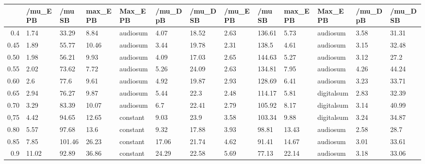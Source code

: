 \begin{table}[ht]
\centering
\begin{tabular}{rllllllllllll}
  \hline
 & /mu\_E PB & /mu SB & max\_E PB & Max\_E PB & /mu\_D pB & /mu\_D SB & /mu\_E PB & /mu SB & max\_E PB & Max\_E PB & /mu\_D pB & /mu\_D SB \\ 
  \hline
0.4 & 1.74 & 33.29 & 8.84 & audiosum & 4.07 & 18.52 & 2.63 & 136.61 & 5.73 & audiosum & 3.58 & 31.31 \\ 
  0.45 & 1.89 & 55.77 & 10.46 & audiosum & 3.44 & 19.78 & 2.31 & 138.5 & 4.61 & audiosum & 3.15 & 32.48 \\ 
  0.50 & 1.98 & 56.21 & 9.93 & audiosum & 4.09 & 17.03 & 2.65 & 144.63 & 5.27 & audiosum & 3.12 & 27.2 \\ 
  0.55 & 2.02 & 73.62 & 7.72 & audiosum & 5.26 & 24.09 & 2.63 & 134.81 & 7.95 & audiosum & 4.26 & 44.24 \\ 
  0.60 & 2.6 & 77.6 & 9.61 & audiosum & 4.92 & 19.87 & 2.93 & 128.69 & 6.41 & audiosum & 3.23 & 33.71 \\ 
  0.65 & 2.94 & 76.27 & 9.87 & audiosum & 5.44 & 22.3 & 2.48 & 114.17 & 5.81 & digitalsum & 2.83 & 32.39 \\ 
  0.70 & 3.29 & 83.39 & 10.07 & audiosum & 6.7 & 22.41 & 2.79 & 105.92 & 8.17 & digitalsum & 3.14 & 40.99 \\ 
  0,75 & 4.42 & 94.65 & 12.65 & constant & 9.03 & 23.9 & 3.58 & 103.34 & 9.88 & digitalsum & 3.24 & 34.87 \\ 
  0.80 & 5.57 & 97.68 & 13.6 & constant & 9.32 & 17.88 & 3.93 & 98.81 & 13.43 & audiosum & 2.58 & 28.7 \\ 
  0.85 & 7.85 & 101.46 & 26.23 & constant & 17.06 & 21.74 & 4.62 & 91.41 & 14.67 & audiosum & 3.01 & 33.61 \\ 
  0.9 & 11.02 & 92.89 & 36.86 & constant & 24.29 & 22.58 & 5.69 & 77.13 & 22.14 & audiosum & 3.18 & 33.06 \\ 
   \hline
\end{tabular}
\end{table}

